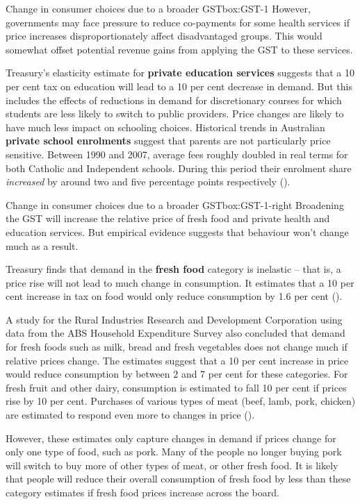 {\begin{lultrabox}{Change in consumer choices due to a broader GST}{box:GST-1}
However, governments may face pressure to reduce co-payments for some health services if price increases disproportionately affect disadvantaged groups. This would somewhat offset potential revenue gains from applying the GST to these services. 

Treasury’s elasticity estimate for \textbf{private education services} suggests that a 10 per cent tax on education will lead to a 10 per cent decrease in demand. But this includes the effects of reductions in demand for discretionary courses for which students are less likely to switch to public providers. Price changes are likely to have much less impact on schooling choices. Historical trends in Australian \textbf{private school enrolments} suggest that parents are not particularly price sensitive. Between 1990 and 2007, average fees roughly doubled in real terms for both Catholic and Independent schools. During this period their enrolment share \emph{increased} by around two and five percentage points respectively (\textcite{NousGroup2011-Funding-for-Schooling}). 
\end{lultrabox}
\begin{rultrabox}{Change in consumer choices due to a broader GST}{box:GST-1-right}
Broadening the GST will increase the relative price of fresh food and private health and education services. But empirical evidence suggests that behaviour won’t change much as a result. 

Treasury finds that demand in the \textbf{fresh food} category is inelastic – that is, a price rise will not lead to much change in consumption. It estimates that a 10 per cent increase in tax on food would only reduce consumption by 1.6 per cent (\textcite{Treasury2015TES2014}).

A study for the Rural Industries Research and Development Corporation using data from the ABS Household Expenditure Survey also concluded that demand for fresh foods such as milk, bread and fresh vegetables does not change much if relative prices change. The estimates suggest that a 10 per cent increase in price would reduce consumption by between 2 and 7 per cent for these categories. For fresh fruit and other dairy, consumption is estimated to fall 10 per cent if prices rise by 10 per cent. Purchases of various types of meat (beef, lamb, pork, chicken) are estimated to respond even more to changes in price (\textcite{UlubasogluMallickWadudEtAl2015}). 

However, these estimates only capture changes in demand if prices change for only one type of food, such as pork. Many of the people no longer buying pork will switch to buy more of other types of meat, or other fresh food. It is likely that people will reduce their overall consumption of fresh food by less than these category estimates if fresh food prices increase across the board. 


\end{rultrabox}}
